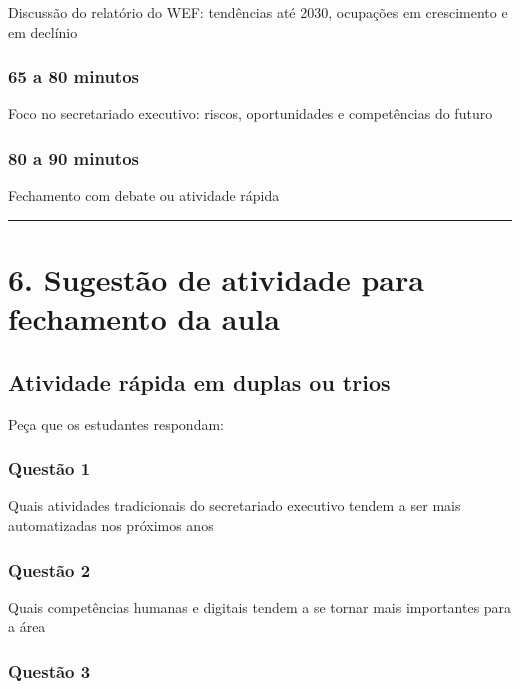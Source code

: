 \documentclass[
]{book}
\theoremstyle{definition}
\theoremstyle{definition}
\theoremstyle{definition}
\theoremstyle{definition}
\theoremstyle{remark}
\begin{document}
Discussão do relatório do WEF: tendências até 2030, ocupações em crescimento e em declínio

\subsection{65 a 80 minutos}\label{a-80-minutos}

Foco no secretariado executivo: riscos, oportunidades e competências do futuro

\subsection{80 a 90 minutos}\label{a-90-minutos}

Fechamento com debate ou atividade rápida

\begin{center}\rule{0.5\linewidth}{0.5pt}\end{center}

\chapter{6. Sugestão de atividade para fechamento da aula}\label{sugestuxe3o-de-atividade-para-fechamento-da-aula}

\section{Atividade rápida em duplas ou trios}\label{atividade-ruxe1pida-em-duplas-ou-trios}

Peça que os estudantes respondam:

\subsection{Questão 1}\label{questuxe3o-1}

Quais atividades tradicionais do secretariado executivo tendem a ser mais automatizadas nos próximos anos

\subsection{Questão 2}\label{questuxe3o-2}

Quais competências humanas e digitais tendem a se tornar mais importantes para a área

\subsection{Questão 3}\label{questuxe3o-3}
\end{document}
